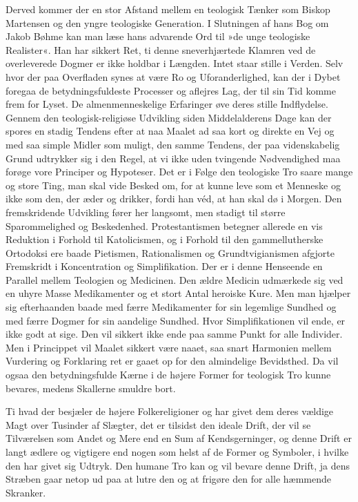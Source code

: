 \documentclass[12pt,a4paper]{article}
\begin{document}
Derved kommer der en stor Afstand mellem en teologisk Tænker som Biskop
Martensen og den yngre teologiske Generation. I Slutningen af hans Bog
om Jakob Bøhme kan man læse hans advarende Ord til »de unge teologiske
Realister«. Han har sikkert Ret, ti denne sneverhjærtede Klamren ved de
overleverede Dogmer er ikke holdbar i Længden. Intet staar stille i
Verden. Selv hvor der paa Overfladen synes at være Ro og
Uforanderlighed, kan der i Dybet foregaa de betydningsfuldeste Processer
og aflejres Lag, der til sin Tid komme frem for Lyset. De
almenmenneskelige Erfaringer øve deres stille Indflydelse. Gennem den
teologisk-religiøse Udvikling siden Middelalderens Dage kan der spores
en stadig Tendens efter at naa Maalet ad saa kort og direkte en Vej og
med saa simple Midler som muligt, den samme Tendens, der paa
videnskabelig Grund udtrykker sig i den Regel, at vi ikke uden tvingende
Nødvendighed maa forøge vore Principer og Hypoteser. Det er i Følge den
teologiske Tro saare mange og store Ting, man skal vide Besked om, for
at kunne leve som et Menneske og ikke som den, der æder og drikker,
fordi han véd, at han skal dø i Morgen. Den fremskridende Udvikling
fører her langsomt, men stadigt til større Sparommelighed og
Beskedenhed. Protestantismen betegner allerede en vis Reduktion i Forhold
til Katolicismen, og i Forhold til den gammellutherske Ortodoksi ere
baade Pietismen, Rationalismen og Grundtvigianismen afgjorte Fremskridt
i Koncentration og Simplifikation. Der er i denne Henseende en Parallel
mellem Teologien og Medicinen. Den ældre Medicin udmærkede sig ved en
uhyre Masse Medikamenter og et stort Antal heroiske Kure. Men man
hjælper sig efterhaanden baade med færre Medikamenter for sin legemlige
Sundhed og med færre Dogmer for sin aandelige Sundhed. Hvor
Simplifikationen vil ende, er ikke godt at sige. Den vil sikkert ikke
ende paa samme Punkt for alle Individer. Men i Princippet vil Maalet
sikkert være naaet, saa snart Harmonien mellem Vurdering og Forklaring
ret er gaaet op for den almindelige Bevidsthed. Da vil ogsaa den
betydningsfulde Kærne i de højere Former for teologisk Tro kunne
bevares, medens Skallerne smuldre bort.

Ti hvad der besjæler de højere Folkereligioner og har givet dem deres
vældige Magt over Tusinder af Slægter, det er tilsidst den ideale Drift,
der vil se Tilværelsen som Andet og Mere end en Sum af Kendsgerninger,
og denne Drift er langt ædlere og vigtigere end nogen som helst af de
Former og Symboler, i hvilke den har givet sig Udtryk. Den humane Tro
kan og vil bevare denne Drift, ja dens Stræben gaar netop ud paa at
lutre den og at frigøre den for alle hæmmende Skranker.
\end{document}
